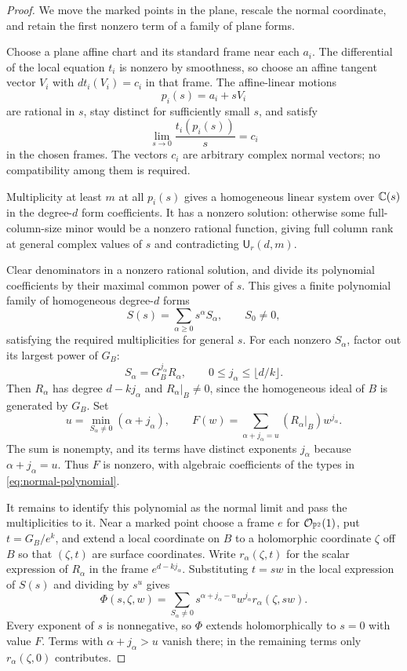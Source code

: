 \begin{proof}
We move the marked points in the plane, rescale the normal coordinate,
and retain the first nonzero term of a family of plane forms.

Choose a plane affine chart and its standard frame near each $a_i$.
The differential of the local equation $t_i$ is nonzero by smoothness,
so choose an affine tangent vector $V_i$ with $dt_i(V_i)=c_i$ in
that frame.  The affine-linear motions
\[
 p_i(s)=a_i+sV_i
\]
are rational in $s$, stay distinct for sufficiently small $s$, and satisfy
\[
 \lim_{s\to0}\frac{t_i(p_i(s))}{s}=c_i
\]
in the chosen frames.  The vectors $c_i$ are arbitrary complex
normal vectors; no compatibility among them is required.

Multiplicity at least $m$ at all $p_i(s)$ gives a homogeneous linear
system over $\mathbb C(s)$ in the degree-$d$ form coefficients.  It has a
nonzero solution: otherwise some full-column-size minor would be a
nonzero rational function, giving full column rank at general complex
values of $s$ and contradicting $\mathsf U_r(d,m)$.

Clear denominators in a nonzero rational solution, and divide its
polynomial coefficients by their maximal common power of $s$.  This
gives a finite polynomial family of homogeneous degree-$d$ forms
\[
 S(s)=\sum_{\alpha\ge0}s^\alpha S_\alpha,
 \qquad S_0\ne0,
\]
satisfying the required multiplicities for general $s$.  For each
nonzero $S_\alpha$, factor out its largest power of $G_B$:
\[
 S_\alpha=G_B^{j_\alpha}R_\alpha,
 \qquad
 0\le j_\alpha\le\lfloor d/k\rfloor.
\]
Then $R_\alpha$ has degree $d-kj_\alpha$ and $R_\alpha|_B\ne0$,
since the homogeneous ideal of $B$ is generated by $G_B$.
Set
\[
 u=\min_{S_\alpha\ne0}(\alpha+j_\alpha),
 \qquad
 F(w)=\sum_{\alpha+j_\alpha=u}
       (R_\alpha|_B)w^{j_\alpha}.
\]
The sum is nonempty, and its terms have distinct exponents $j_\alpha$
because $\alpha+j_\alpha=u$.  Thus $F$ is nonzero, with algebraic
coefficients of the types in \eqref{eq:normal-polynomial}.

It remains to identify this polynomial as the normal limit and pass
the multiplicities to it.  Near a marked point choose a frame $e$ for
$\mathcal O_{\mathbb P^2}(1)$, put $t=G_B/e^k$, and extend a local coordinate
on $B$ to a holomorphic coordinate $\zeta$ off $B$ so that $(\zeta,t)$
are surface coordinates.  Write $r_\alpha(\zeta,t)$ for the scalar
expression of $R_\alpha$ in the frame $e^{d-kj_\alpha}$.  Substituting
$t=sw$ in the local expression of $S(s)$ and dividing by $s^u$ gives
\[
 \Phi(s,\zeta,w)
 =\sum_{S_\alpha\ne0}
 s^{\alpha+j_\alpha-u}w^{j_\alpha}
 r_\alpha(\zeta,sw).
\]
Every exponent of $s$ is nonnegative, so $\Phi$ extends
holomorphically to $s=0$ with value $F$.  Terms with
$\alpha+j_\alpha>u$ vanish there; in the remaining terms only
$r_\alpha(\zeta,0)$ contributes.


\end{proof}
